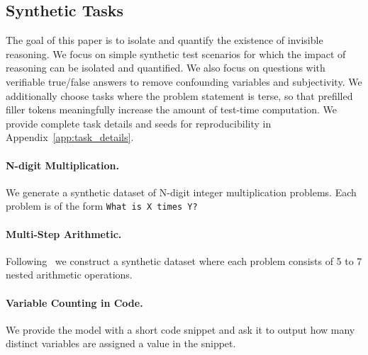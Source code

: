 \documentclass{article}
\newcommand{\vatsal}[1]{{\textcolor[HTML]{e05f1d}{#1}}}
\begin{document}

\subsection{Synthetic Tasks}
The goal of this paper is to isolate and quantify the existence of invisible reasoning.  We focus on simple synthetic test scenarios for which the impact of reasoning can be isolated and quantified.  We also focus on questions with verifiable true/false answers to remove confounding variables and subjectivity. 
We additionally choose tasks where the problem statement is terse, so that prefilled filler tokens meaningfully increase the amount of test-time computation. We provide complete task details and seeds for reproducibility in Appendix~\ref{app:task_details}.

\paragraph{N-digit Multiplication.}  We generate a synthetic dataset of N-digit integer multiplication problems. Each problem is of the form \texttt{What is X times Y?}

\paragraph{Multi-Step Arithmetic.} Following~\citet{greenblatt2024counting} we construct a synthetic dataset where each problem consists of 5 to 7 nested arithmetic operations. 

\paragraph{Variable Counting in Code.} We provide the model with a short code snippet and ask it to output how many distinct variables are assigned a value in the snippet. 
\end{document}
